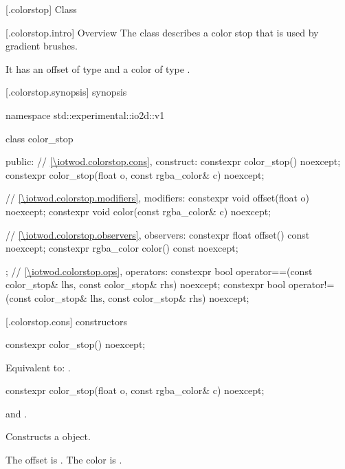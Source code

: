  [\iotwod.colorstop] {Class }

 [\iotwod.colorstop.intro] {Overview}
\pnum
{}%
The class  describes a color stop that is used by gradient brushes.

\pnum
It has an offset of type  and a color of type .

 [\iotwod.colorstop.synopsis] { synopsis}

\begin{codeblock}
namespace std::experimental::io2d::v1 {
  class color_stop {
  public:
    // \ref{\iotwod.colorstop.cons}, construct:
    constexpr color_stop() noexcept;
    constexpr color_stop(float o, const rgba_color& c) noexcept;
    
    // \ref{\iotwod.colorstop.modifiers}, modifiers:
    constexpr void offset(float o) noexcept;
    constexpr void color(const rgba_color& c) noexcept;
	
    // \ref{\iotwod.colorstop.observers}, observers:
    constexpr float offset() const noexcept;
    constexpr rgba_color color() const noexcept;
  };
  // \ref{\iotwod.colorstop.ops}, operators:
  constexpr bool operator==(const color_stop& lhs, const color_stop& rhs)
    noexcept;
  constexpr bool operator!=(const color_stop& lhs, const color_stop& rhs)
    noexcept;
}
\end{codeblock}

 [\iotwod.colorstop.cons] { constructors}

%
\begin{itemdecl}
constexpr color_stop() noexcept;
\end{itemdecl}
\begin{itemdescr}
\pnum
\effects
Equivalent to: .
\end{itemdescr}

%
\begin{itemdecl}
constexpr color_stop(float o, const rgba_color& c) noexcept;
\end{itemdecl}
\begin{itemdescr}
\pnum
\requires
{} and .

\pnum
\effects
Constructs a  object.

\pnum
The offset is . The color is .
\end{itemdescr}

